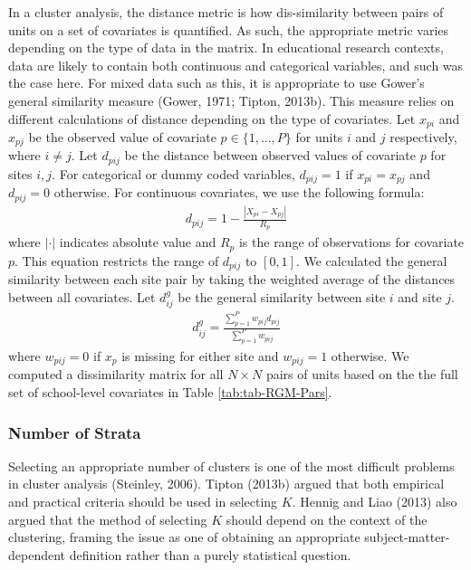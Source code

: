 \documentclass[english,man,floatsintext]{apa6}
\begin{document}
In a cluster analysis, the distance metric is how dis-similarity between pairs of units on a set of covariates is quantified. As such, the appropriate metric varies depending on the type of data in the matrix.
In educational research contexts, data are likely to contain both continuous and categorical variables, and such was the case here. For mixed data such as this, it is appropriate to use Gower's general similarity measure (Gower, 1971; Tipton, 2013b). This measure relies on different calculations of distance depending on the type of covariates. Let \(x_{pi}\) and \(x_{pj}\) be the observed value of covariate \(p \in \{1, ..., P\}\) for units \(i\) and \(j\) respectively, where \(i \ne j\). Let \(d_{pij}\) be the distance between observed values of covariate \(p\) for sites \(i,j\). For categorical or dummy coded variables, \(d_{pij} = 1\) if \(x_{pi} = x_{pj}\) and \(d_{pij} = 0\) otherwise. For continuous covariates, we use the following formula:
\begin{align}
\label{eq:gowerdist-p}
d_{pij} = 1 - \frac{|X_{pi} - X_{pj}|}{R_p}
\end{align}
where \(|\cdot|\) indicates absolute value and \(R_p\) is the range of observations for covariate \(p\). This equation restricts the range of \(d_{pij}\) to \([0,1]\). We calculated the general similarity between each site pair by taking the weighted average of the distances between all covariates. Let \(d^{g}_{ij}\) be the general similarity between site \(i\) and site \(j\).
\begin{align}
\label{eq:gowerdist}
d^{g}_{ij} = \frac{\sum^P_{p = 1} w_{pij} d_{pij}}{\sum^P_{p = 1} w_{pij}}
\end{align}
where \(w_{pij} = 0\) if \(x_p\) is missing for either site and \(w_{pij} = 1\) otherwise.
We computed a dissimilarity matrix for all \(N \times N\) pairs of units based on the the full set of school-level covariates in Table \ref{tab:tab-RGM-Pars}.

\hypertarget{number-of-strata}{%
\subsubsection{Number of Strata}\label{number-of-strata}}

Selecting an appropriate number of clusters is one of the most difficult problems in cluster analysis (Steinley, 2006). Tipton (2013b) argued that both empirical and practical criteria should be used in selecting \(K\). Hennig and Liao (2013) also argued that the method of selecting \(K\) should depend on the context of the clustering, framing the issue as one of obtaining an appropriate subject-matter-dependent definition rather than a purely statistical question.
\end{document}
